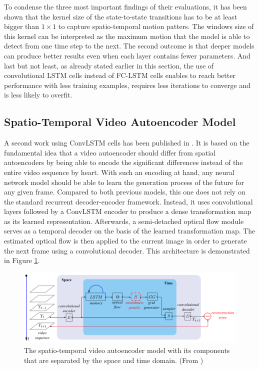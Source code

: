 To condense the three most important findings of their evaluations, it has been shown that the kernel size of the state-to-state transitions has to be at least bigger than $1 \times 1$ to capture spatio-temporal motion patters. The windows size of this kernel can be interpreted as the maximum motion that the model is able to detect from one time step to the next. The second outcome is that deeper models can produce better results even when each layer contains fewer parameters. And last but not least, as already stated earlier in this section, the use of convolutional LSTM cells instead of FC-LSTM cells enables to reach better performance with less training examples, requires less iterations to converge and is less likely to overfit.


\subsection{Spatio-Temporal Video Autoencoder Model}

A second work using ConvLSTM cells has been published in \parencite{spat_temp_video_autoenc}. It is based on the fundamental idea that a video autoencoder should differ from spatial autoencoders by being able to encode the significant differences instead of the entire video sequence by heart. With such an encoding at hand, any neural network model should be able to learn the generation process of the future for any given frame. Compared to both previous models, this one does not rely on the standard recurrent decoder-encoder framework. Instead, it uses convolutional layers followed by a ConvLSTM encoder to produce a dense transformation map as its learned representation. Afterwards, a semi-detached optical flow module serves as a temporal decoder on the basis of the learned transformation map. The estimated optical flow is then applied to the current image in order to generate the next frame using a convolutional decoder. This architecture is demonstrated in Figure \ref{fig:spatiotemp_model}.

\begin{figure}[htb]
	\centering
	\includegraphics[width=0.9\linewidth]{figures/related/spat_temp_video.png} 
	\caption[Spatio-Temporal Video Autoencoder Model]{The spatio-temporal video autoencoder model with its components that are separated by the space and time domain. (From \parencite{spat_temp_video_autoenc})} \label{fig:spatiotemp_model}
\end{figure}

